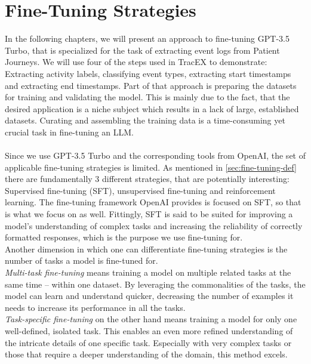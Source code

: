 \section{Fine-Tuning Strategies}\label{sec:fine}
In the following chapters, we will present an approach to fine-tuning GPT-3.5 Turbo, that is specialized for the task of extracting event logs from Patient Journeys. We will use four of the steps used in TracEX to demonstrate: Extracting activity labels, classifying event types, extracting start timestamps and extracting end timestamps. Part of that approach is preparing the datasets for training and validating the model. This is mainly due to the fact, that the desired application is a niche subject which results in a lack of large, established datasets. Curating and assembling the training data is a time-consuming yet crucial task in fine-tuning an LLM.\\\\
Since we use GPT-3.5 Turbo and the corresponding tools from OpenAI, the set of applicable fine-tuning strategies is limited. As mentioned in \ref{sec:fine-tuning-def} there are fundamentally 3 different strategies, that are potentially interesting: Supervised fine-tuning (SFT), unsupervised fine-tuning and reinforcement learning. The fine-tuning framework OpenAI provides is focused on SFT, so that is what we focus on as well. Fittingly, SFT is said to be suited for improving a model's understanding of complex tasks and increasing the reliability of correctly formatted responses, which is the purpose we use fine-tuning for.\\
Another dimension in which one can differentiate fine-tuning strategies is the number of tasks a model is fine-tuned for.\\
\emph{Multi-task fine-tuning} means training a model on multiple related tasks at the same time – within one dataset. By leveraging the commonalities of the tasks, the model can learn and understand quicker, decreasing the number of examples it needs to increase its performance in all the tasks.~\cite{pilault_conditionally_2020}\\
\emph{Task-specific fine-tuning} on the other hand means training a model for only one well-defined, isolated task. This enables an even more refined understanding of the intricate details of one specific task. Especially with very complex tasks or those that require a deeper understanding of the domain, this method excels.~\cite{xinxi_single_2021}\\\\
